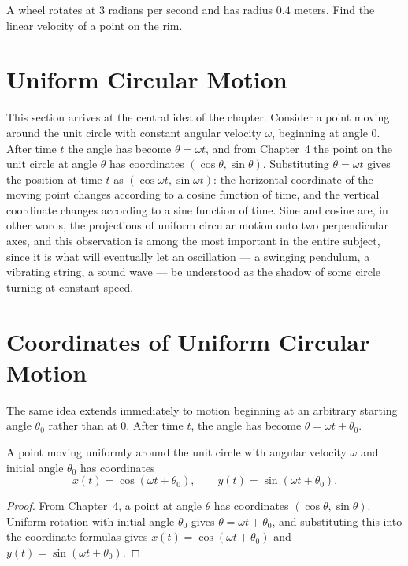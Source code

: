 \begin{practicenow}
A wheel rotates at $3$ radians per second and has radius $0.4$ meters.
Find the linear velocity of a point on the rim.
\end{practicenow}

\section{Uniform Circular Motion}

This section arrives at the central idea of the chapter. Consider a point
moving around the unit circle with constant angular velocity $\omega$,
beginning at angle $0$. After time $t$ the angle has become $\theta =
\omega t$, and from Chapter~4 the point on the unit circle at angle
$\theta$ has coordinates $(\cos\theta, \sin\theta)$. Substituting $\theta =
\omega t$ gives the position at time $t$ as $(\cos\omega t, \sin\omega t)$:
the horizontal coordinate of the moving point changes according to a cosine
function of time, and the vertical coordinate changes according to a sine
function of time. Sine and cosine are, in other words, the projections of
uniform circular motion onto two perpendicular axes, and this observation
is among the most important in the entire subject, since it is what will
eventually let an oscillation --- a swinging pendulum, a vibrating string, a
sound wave --- be understood as the shadow of some circle turning at
constant speed.

\section{Coordinates of Uniform Circular Motion}

The same idea extends immediately to motion beginning at an arbitrary
starting angle $\theta_0$ rather than at $0$. After time $t$, the angle has
become $\theta = \omega t + \theta_0$.

\begin{theorem}
A point moving uniformly around the unit circle with angular velocity
$\omega$ and initial angle $\theta_0$ has coordinates
\[
x(t) = \cos(\omega t + \theta_0), \qquad y(t) = \sin(\omega t + \theta_0).
\]
\end{theorem}

\begin{proof}
From Chapter~4, a point at angle $\theta$ has coordinates $(\cos\theta,
\sin\theta)$. Uniform rotation with initial angle $\theta_0$ gives $\theta =
\omega t + \theta_0$, and substituting this into the coordinate formulas
gives $x(t) = \cos(\omega t + \theta_0)$ and $y(t) = \sin(\omega t +
\theta_0)$.
\end{proof}

